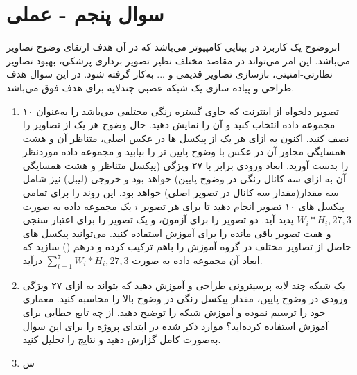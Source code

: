 \section{سوال پنجم - عملی}
ابروضوح یک کاربرد در بینایی کامپیوتر می‌باشد که در آن هدف ارتقای وضوح تصاویر می‌باشد. این امر می‌تواند در مقاصد مختلف نظیر تصویر برداری پزشکی، بهبود تصاویر نظارتی-امنیتی، بازسازی تصاویر قدیمی و ... به‌کار گرفته شود. در این سوال هدف طراحی و پیاده سازی یک شبکه عصبی چند‌لایه برای هدف فوق می‌باشد.



\begin{enumerate}
	\item ۱۰ تصویر دلخواه از اینترنت که حاوی گستره رنگی مختلفی می‌باشد را به‌عنوان مجموعه داده انتخاب کنید و آن را نمایش دهید. حال وضوح هر یک از تصاویر را نصف کنید. اکنون به ازای هر یک از پیکسل ها در عکس اصلی، متناظر آن و هشت همسایگی مجاور آن در عکس با وضوح پایین تر را بیابید و مجموعه داده موردنظر را بدست آورید. ابعاد ورودی برابر با ۲۷ ویژگی (پیکسل متناظر و هشت همسایگی آن به ازای سه کانال رنگی در وضوح پایین) خواهد بود و خروجی (لیبل) نیز شامل سه مقدار(مقدار سه کانال  در تصویر اصلی) خواهد بود. 	این روند را برای تمامی پیکسل های ۱۰ تصویر انجام دهید تا برای هر تصویر $i$ یک مجموعه داده به صورت 
	$W_i*H_i, 27, 3$ پدید آید. دو تصویر را برای آزمون، و یک تصویر را برای اعتبار سنجی و هفت تصویر باقی مانده را برای آموزش استفاده کنید. می‌توانید پیکسل های حاصل از تصاویر مختلف در گروه آموزش را باهم ترکیب کرده و درهم () سازید که ابعاد آن مجموعه داده به صورت $\sum_{i=1}^{7} W_i*H_i, 27, 3$ در‌آید.
	


	
	
	
	
	
	\item یک شبکه چند لایه پرسپترونی طراحی و آموزش دهید که بتواند به ازای ۲۷ ویژگی ورودی در وضوح پایین، مقدار پیکسل رنگی در وضوح بالا را محاسبه کنید. معماری خود را ترسیم نموده و آموزش شبکه را توضیح دهید. از چه تابع خطایی برای آموزش استفاده کرده‌اید؟ موارد ذکر شده در ابتدای پروژه را برای این سوال به‌صورت کامل گزارش دهید و نتایج را تحلیل کنید.
	
	
	
	\item س



\end{enumerate}